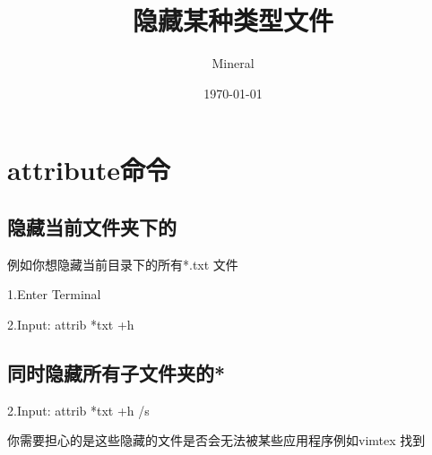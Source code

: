 \documentclass[utf8]{ctexart}
\author{Mineral}
\title{隐藏某种类型文件}
\date {\today}
\begin{document}
		\maketitle
		\section{attribute命令}
		\subsection{隐藏当前文件夹下的}
		
		\par 例如你想隐藏当前目录下的所有*.txt 文件
		\par 1.Enter Terminal
		\par 2.Input: 	attrib *txt +h
		\subsection{同时隐藏所有子文件夹的*}
		\par 2.Input: 	attrib *txt +h /s
		\par 你需要担心的是这些隐藏的文件是否会无法被某些应用程序例如vimtex  找到		
\end{document}
